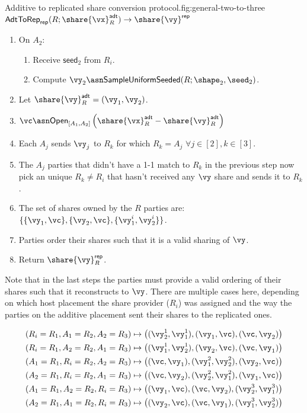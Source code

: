 \begin{Boxfig}{Additive to replicated share conversion
protocol.}{fig:general-two-to-three}{$\mathsf{AdtToRep}_\mathsf{rep}(R;
\share{\vx}^{\mathsf{adt}}_{R}) \rightarrow \share{\vy}^\mathsf{rep}$}
\begin{enumerate}
\begin{enumerate}
    \item Receive $\mathsf{seed}_1$ from $R_i$.
    \item Compute $\vy_1 \asn \mathsf{SampleUniformSeeded}(R; \shape_1, \seed_1)$.
\end{enumerate}
\item On $A_2$:
\begin{enumerate}
    \item Receive $\mathsf{seed}_2$ from $R_i$.
    \item Compute $\vy_2 \asn \mathsf{SampleUniformSeeded}(R; \shape_2, \seed_2)$.
\end{enumerate}
\item Let $\share{\vy}^{\mathsf{adt}}_{R} = (\vy_1, \vy_2)$.
\item $\vc \asn \mathsf{Open}_{[A_1, A_2]}\left( \share{\vx}^{\mathsf{adt}}_{R}
- \share{\vy}^{\mathsf{adt}}_{R} \right)$
\item Each $A_j$ sends $\vy_j$ to $R_k$ for which $R_k = A_j$ $\forall j \in [2], k \in [3]$.
\item The $A_j$ parties that didn't have a 1-1 match to $R_k$ in the previous step now pick an unique $R_k \neq R_i$
that hasn't received any $\vy$ share and sends it to $R_k$.
\item The set of shares owned by the $R$ parties are: $\{ \{\vy_1, \vc\}, \{\vy_2, \vc\}, \{\vy^i_1, \vy^i_2\} \}$.
\item Parties order their shares such that it is a valid sharing of $\vy$.
\item Return $\share{\vy}^{\mathsf{rep}}_{R}$.
\end{enumerate}
\end{Boxfig}

Note that in the last steps the parties must provide a valid ordering of their
shares such that it reconstructs to $\vy$. There are multiple cases here,
depending on which host placement the share provider ($R_i$) was assigned and
the way the parties on the additive placement sent their shares to the replicated ones.

\begin{align*}
(R_i = R_1, A_1 = R_2, A_2 = R_3) \mapsto \left( (\vy_2^1, \vy_1^1), (\vy_1, \vc), (\vc, \vy_2) \right) \\
(R_i = R_1, A_2 = R_2, A_1 = R_3) \mapsto \left( (\vy_1^1, \vy_2^1), (\vy_2, \vc), (\vc, \vy_1) \right) \\
(A_1 = R_1, R_i = R_2, A_2 = R_3) \mapsto \left( (\vc, \vy_1), (\vy^2_1, \vy^2_2), (\vy_2, \vc) \right) \\
(A_2 = R_1, R_i = R_2, A_1 = R_3) \mapsto \left( (\vc, \vy_2), (\vy^2_2, \vy^2_1), (\vy_1, \vc) \right) \\
(A_1 = R_1, A_2 = R_2, R_i = R_3) \mapsto \left( (\vy_1, \vc), (\vc, \vy_2), (\vy_2^3, \vy_1^3) \right) \\
(A_2 = R_1, A_1 = R_2, R_i = R_3) \mapsto \left( (\vy_2, \vc), (\vc, \vy_1), (\vy_1^3, \vy_2^3) \right)
\end{align*}